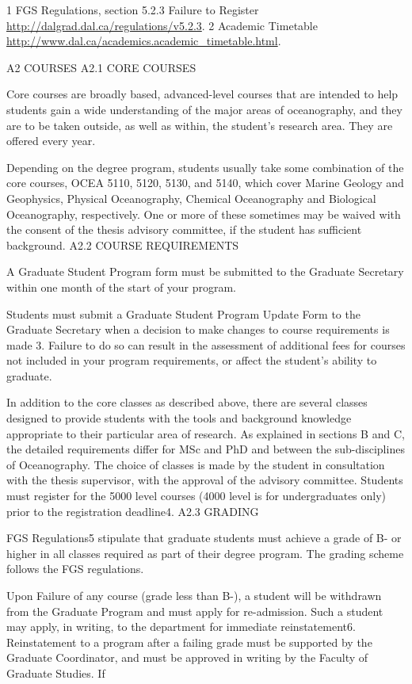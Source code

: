 \documentclass{article}
\newcommand\elink[1]{\url{#1}}
\begin{document}
1 FGS Regulations, section 5.2.3 Failure to Register \elink{http://dalgrad.dal.ca/regulations/v5.2.3}.
2 Academic Timetable \elink{http://www.dal.ca/academics.academic_timetable.html}.
 

A2	COURSES
A2.1	CORE COURSES

Core courses are broadly based, advanced-level courses that are intended to help students gain a wide understanding of the major areas of oceanography, and they are to be taken outside, as well as within, the student’s research area. They are offered every year.

Depending on the degree program, students usually take some combination of the core courses, OCEA 5110, 5120, 5130, and 5140, which cover Marine Geology and Geophysics, Physical Oceanography, Chemical Oceanography and Biological Oceanography, respectively. One or more of these sometimes may be waived with the consent of the thesis advisory committee, if the student has sufficient background.
A2.2	COURSE REQUIREMENTS

A Graduate Student Program form must be submitted to the Graduate Secretary within one month of the start of your program.

Students must submit a Graduate Student Program Update Form to the Graduate Secretary when a decision to make changes to course requirements is made 3. Failure to do so can result in the assessment of additional fees for courses not included in your program requirements, or affect the student’s ability to graduate.

In addition to the core classes as described above, there are several classes designed to provide students with the tools and background knowledge appropriate to their particular area of research. As explained in sections B and C, the detailed requirements differ for MSc and PhD and between the sub-disciplines of Oceanography. The choice of classes is made by the student in consultation with the thesis supervisor, with the approval of the advisory committee. Students must register for the 5000 level
courses (4000 level is for undergraduates only) prior to the registration deadline4.
A2.3	GRADING

FGS Regulations5 stipulate that graduate students must achieve a grade of B- or higher in all classes required as part of their degree program.  The grading scheme follows the FGS regulations.

Upon Failure of any course (grade less than B-), a student will be withdrawn from the Graduate Program and must apply for re-admission. Such a student may apply, in writing, to the department for immediate reinstatement6. Reinstatement to a program after a failing grade must be supported by the Graduate Coordinator, and must be approved in writing by the Faculty of Graduate Studies. If
\end{document}

